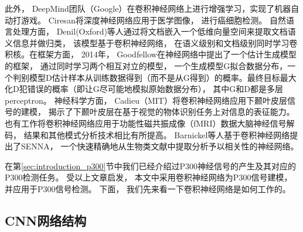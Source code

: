 此外， DeepMind团队（Google）\cite{mnih2013playing}在卷积神经网络上进行增强学习，实现了机器自动打游戏。 Ciresan\cite{ciresan2013mitosis}将深度神经网络应用于医学图像， 进行癌细胞检测。  自然语言处理方面， Denil(Oxford)等人通过将文档嵌入一个低维向量空间来提取文档语义信息并做归类，  该模型基于卷积神经网络， 在语义级别和文档级别同时学习卷积核。在框架方面， 2014年， Goodfellow在神经网络中提出了一个估计生成模型的框架\cite{goodfellow2014generative}， 通过同时学习两个相互对立的模型， 一个生成模型G拟合数据分布，一个判别模型D估计样本从训练数据得到（而不是从G得到）的概率。最终目标最大化D犯错误的概率（即让G尽可能地模拟原始数据分布）， 其中G和D都是多层perceptron。 神经科学方面， Cadieu（MIT）将卷积神经网络应用下颞叶皮层信号的建模\cite{cadieu2014deep}， 揭示了下颞叶皮层在基于视觉的物体识别任务上对信息的表征能力。 也有工作将卷积神经网络应用于功能性磁共振成像（fMRI）数据大脑神经信号解码\cite{firat2014learning}， 结果和其他模式分析技术相比有所提高。 Barnickel等人基于卷积神经网络提出了SENNA， 一个快速精确地从生物类文献中提取分析予以相关性的神经网络\cite{barnickel2009large}。 

在第\ref{sec:introduction_p300}节中我们已经介绍过P300神经信号的产生及其对应的P300检测任务。 受以上文章启发， 本文中采用卷积神经网络为P300信号建模， 并应用于P300信号检测。 下面， 我们先来看一下卷积神经网络是如何工作的。


\subsection{CNN网络结构}\label{sec:cnn_arch}

